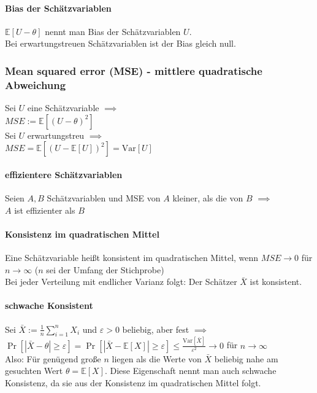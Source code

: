 \documentclass[a4paper,9pt]{extarticle}
\newcommand{\Var}{\text{Var}}
\begin{document}
\paragraph*{Bias der Schätzvariablen}
$\mathbb{E}[U-\theta]$ nennt man Bias der Schätzvariablen $U$. \\
Bei erwartungstreuen Schätzvariablen ist der Bias gleich null.

\subsubsection*{Mean squared error (MSE) - mittlere quadratische Abweichung}
Sei $U$ eine Schätzvariable $\implies$ \\
$MSE := \mathbb{E}[(U-\theta)^2]$ \\

Sei $U$ erwartungstreu $\implies$ \\
$MSE = \mathbb{E}[(U - \mathbb{E}[U])^2] = \Var[U]$

\paragraph*{effizientere Schätzvariablen}
Seien $A, B$ Schätzvariablen und MSE von $A$ kleiner, als die von $B$ $\implies$ \\
$A$ ist effizienter als $B$

\paragraph*{Konsistenz im quadratischen Mittel}
Eine Schätzvariable heißt konsistent im quadratischen Mittel, wenn $MSE → 0$ für $n → ∞$ ($n$ sei der Umfang der Stichprobe) \\

Bei jeder Verteilung mit endlicher Varianz folgt: Der Schätzer $\bar{X}$ ist konsistent.

\paragraph*{schwache Konsistent}
Sei $\bar{X} := \frac 1 n \sum_{i=1}^n X_i$ und $\varepsilon > 0$ beliebig, aber fest $\implies$ \\
$\Pr[|\bar{X} - \theta| ≥ \varepsilon] = \Pr[|\bar{X} - \mathbb{E}[X]| ≥ \varepsilon] ≤ \frac{\Var[\bar{X}]}{\varepsilon^2} → 0$ für $n → ∞$ \\
Also: Für genügend große $n$ liegen als die Werte von $\bar{X}$ beliebig nahe am gesuchten Wert $\theta = \mathbb{E}[X]$. Diese Eigenschaft nennt man auch schwache Konsistenz, da sie aus der Konsistenz im quadratischen Mittel folgt.
\end{document}

